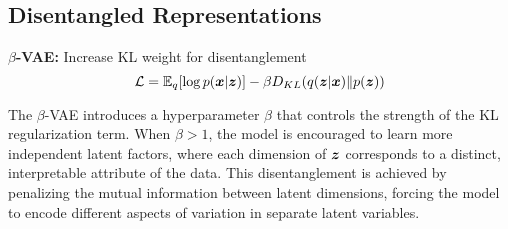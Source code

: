 \subsection{Disentangled Representations}

\textbf{$\beta$-VAE:} Increase KL weight for disentanglement
\begin{equation}
\mathcal{L} = \mathbb{E}_{q}[\log p(\boldsymbol{x}|\boldsymbol{z})] - \beta D_{KL}(q(\boldsymbol{z}|\boldsymbol{x}) \| p(\boldsymbol{z}))
\end{equation}

The $\beta$-VAE introduces a hyperparameter $\beta$ that controls the strength of the KL regularization term. When $\beta > 1$, the model is encouraged to learn more independent latent factors, where each dimension of $\boldsymbol{z}$ corresponds to a distinct, interpretable attribute of the data. This disentanglement is achieved by penalizing the mutual information between latent dimensions, forcing the model to encode different aspects of variation in separate latent variables.





